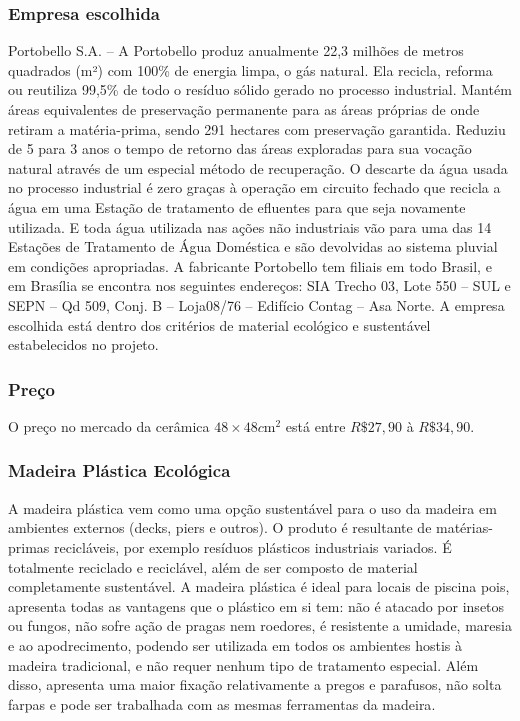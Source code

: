\subsubsection*{\textbf{Empresa escolhida}}

Portobello S.A. – A Portobello produz anualmente 22,3 milhões de metros quadrados (m²) com 100\% de energia limpa, o gás natural. Ela recicla, reforma ou reutiliza 99,5\% de todo o resíduo sólido gerado no processo industrial. Mantém áreas equivalentes de preservação permanente para as áreas próprias de onde retiram a matéria-prima, sendo 291 hectares com preservação garantida. Reduziu de 5 para 3 anos o tempo de retorno das áreas exploradas para sua vocação natural através de um especial método de recuperação.
O descarte da água usada no processo industrial é zero graças à operação em circuito fechado que recicla a água em uma Estação de tratamento de efluentes para que seja novamente utilizada. E toda água utilizada nas ações não industriais vão para uma das 14 Estações de Tratamento de Água Doméstica e são devolvidas ao sistema pluvial em condições apropriadas.
A fabricante Portobello tem filiais em todo Brasil, e em Brasília se encontra nos seguintes endereços: SIA Trecho 03, Lote 550 – SUL e SEPN – Qd 509, Conj. B – Loja08/76 – Edifício Contag – Asa Norte.
A empresa escolhida está dentro dos critérios de material ecológico e sustentável estabelecidos no projeto.




\subsubsection*{\textbf{Preço}}
	
	O preço no mercado da cerâmica $48\times48 c\si{\meter}^{2}$ está entre $R\$ 27,90$ à $R\$ 34,90$.\cite{precoCeramica}


\subsubsection*{\textbf{Madeira Plástica Ecológica}}
	
	
	A madeira plástica vem como uma opção sustentável para o uso da madeira em ambientes externos (decks, piers e outros). O produto é resultante de matérias-primas recicláveis, por exemplo resíduos plásticos industriais variados\cite{EcoCasa}. É totalmente reciclado e reciclável, além de ser composto de material completamente sustentável\cite{ReWood}. A madeira plástica é ideal para locais de piscina pois, apresenta todas as vantagens que o plástico em si tem: não é atacado por insetos ou fungos, não sofre ação de pragas nem roedores, é resistente a umidade, maresia e ao apodrecimento, podendo ser utilizada em todos os ambientes hostis à madeira tradicional, e não requer nenhum tipo de tratamento especial. Além disso, apresenta uma maior fixação relativamente a pregos e parafusos, não solta farpas e pode ser trabalhada com as mesmas ferramentas da madeira\cite{ReWood}.

